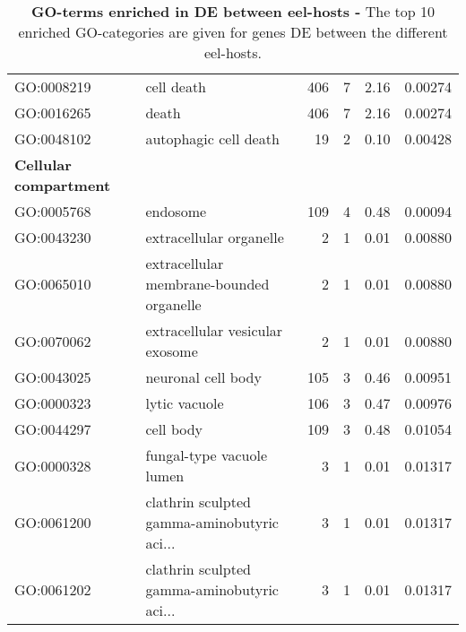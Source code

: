 \begin{table}[ht]
\begin{center}
\begin{tabular}{llrrrl}
  GO:0008219 & cell death & 406 &   7 & 2.16 & 0.00274 \\ 
  GO:0016265 & death & 406 &   7 & 2.16 & 0.00274 \\ 
  GO:0048102 & autophagic cell death &  19 &   2 & 0.10 & 0.00428 \\ 
  \hline
  \textbf{Cellular compartment} &  &   &   &  &  \\ 
  GO:0005768 & endosome & 109 &   4 & 0.48 & 0.00094 \\ 
  GO:0043230 & extracellular organelle &   2 &   1 & 0.01 & 0.00880 \\ 
  GO:0065010 & extracellular membrane-bounded organelle &   2 &   1 & 0.01 & 0.00880 \\ 
  GO:0070062 & extracellular vesicular exosome &   2 &   1 & 0.01 & 0.00880 \\ 
  GO:0043025 & neuronal cell body & 105 &   3 & 0.46 & 0.00951 \\ 
  GO:0000323 & lytic vacuole & 106 &   3 & 0.47 & 0.00976 \\ 
  GO:0044297 & cell body & 109 &   3 & 0.48 & 0.01054 \\ 
  GO:0000328 & fungal-type vacuole lumen &   3 &   1 & 0.01 & 0.01317 \\ 
  GO:0061200 & clathrin sculpted gamma-aminobutyric aci... &   3 &   1 & 0.01 & 0.01317 \\ 
  GO:0061202 & clathrin sculpted gamma-aminobutyric aci... &   3 &   1 & 0.01 & 0.01317 \\ 
  \hline
\end{tabular}
\caption[GO-terms enriched in DE between eel-hosts]{\textbf{GO-terms
    enriched in DE between eel-hosts -} The top 10 enriched
  GO-categories are given for genes DE between the different
  eel-hosts.}
\end{center}
\end{table}



